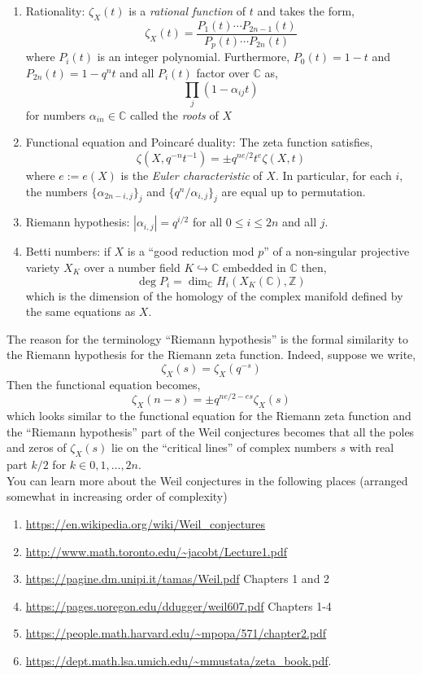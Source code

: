 \documentclass[12pt]{article}
\newcommand{\embed}{\hookrightarrow}
\newcommand{\Z}{\mathbb{Z}}
\newcommand{\CC}{\mathbb{C}}
\theoremstyle{remark}
\theoremstyle{definition}
\begin{document}
\begin{enumerate}
\item Rationality: $\zeta_X(t)$ is a \textit{rational function} of $t$ and takes the form,
\[ \zeta_X(t) = \frac{P_1(t) \cdots P_{2n-1}(t)}{P_p(t) \cdots P_{2n}(t)} \]
where $P_i(t)$ is an integer polynomial. Furthermore, $P_0(t) = 1 - t$ and $P_{2n}(t) = 1 - q^n t$ and all $P_i(t)$ factor over $\CC$ as,
\[ \prod_j (1 - \alpha_{ij} t) \]
for numbers $\alpha_{in} \in \CC$ called the \textit{roots} of $X$

\item Functional equation and Poincar\'{e} duality: The zeta function satisfies,
\[ \zeta(X, q^{-n} t^{-1}) = \pm q^{ne/2} t^e \zeta(X, t) \]
where $e := e(X)$ is the \textit{Euler characteristic} of $X$. In particular, for each $i$, the numbers $\{ \alpha_{2n - i, j} \}_j$ and $\{ q^n / \alpha_{i,j} \}_j$ are equal up to permutation.

\item Riemann hypothesis: $|\alpha_{i,j}| = q^{i/2}$ for all $0 \le i \le 2n$ and all $j$.

\item Betti numbers: if $X$ is a ``good reduction mod $p$'' of a non-singular projective variety $X_K$ over a number field $K \embed \CC$ embedded in $\CC$ then,
\[ \deg{P_i} = \dim_{\CC} H_i(X_K(\CC), \Z) \]
which is the dimension of the homology of the complex manifold defined by the same equations as $X$.
\end{enumerate}

The reason for the terminology ``Riemann hypothesis'' is the formal similarity to the Riemann hypothesis for the Riemann zeta function. Indeed, suppose we write,
\[ \zeta_X(s) = \zeta_X(q^{-s}) \]
Then the functional equation becomes,
\[ \zeta_X(n-s) = \pm q^{ne/2 - e s} \zeta_X(s) \]
which looks similar to the functional equation for the Riemann zeta function and the ``Riemann hypothesis'' part of the Weil conjectures becomes that all the poles and zeros of $\zeta_X(s)$ lie on the ``critical lines'' of complex numbers $s$ with real part $k/2$ for $k \in 0,1,\dots,2n$. 
\bigskip\\
You can learn more about the Weil conjectures in the following places (arranged somewhat in increasing order of complexity)
\begin{enumerate}
\item \url{https://en.wikipedia.org/wiki/Weil_conjectures}
\item \url{http://www.math.toronto.edu/~jacobt/Lecture1.pdf}
\item \url{https://pagine.dm.unipi.it/tamas/Weil.pdf} Chapters 1 and 2
\item \url{https://pages.uoregon.edu/ddugger/weil607.pdf} Chapters 1-4
\item \url{https://people.math.harvard.edu/~mpopa/571/chapter2.pdf}
\item \url{https://dept.math.lsa.umich.edu/~mmustata/zeta_book.pdf}.
\end{enumerate}
\end{document}
